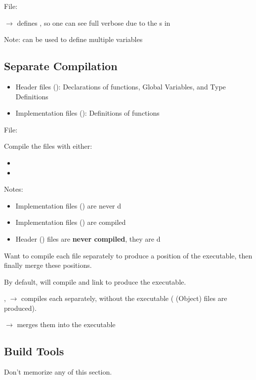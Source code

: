 File: 

 $ \rightarrow $ defines , so
one can see full verbose due to the s in 

Note:  can be used to define multiple variables

\subsection{Separate Compilation}
\begin{itemize}
    \item Header files (): Declarations of functions, Global Variables,
    and Type Definitions
    \item Implementation files (): Definitions of functions
\end{itemize}


File: 

Compile the files with either:
\begin{itemize}
    \item {}
    \item {}
\end{itemize}
Notes:
\begin{itemize}
    \item Implementation files () are never d
    \item Implementation files () are compiled
    \item Header () files are \textbf{never compiled}, they are d
\end{itemize}

Want to compile each file separately to produce a position of the executable,
then finally merge these positions.

By default,  will compile and link to produce the executable.

,  $ \rightarrow $ compiles each
separately, without the executable ( (Object) files are produced).

 $ \rightarrow $ merges them into
the  executable

\subsection{Build Tools}
Don't memorize any of this section.

